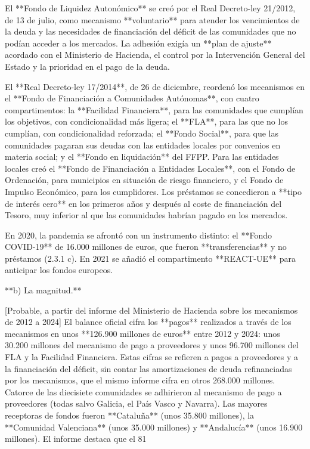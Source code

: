 \documentclass[10pt,a4paper]{article}
\begin{document}
El **Fondo de Liquidez Autonómico** se creó por el Real Decreto-ley 21/2012, de 13 de julio, como mecanismo **voluntario** para atender los vencimientos de la deuda y las necesidades de financiación del déficit de las comunidades que no podían acceder a los mercados. La adhesión exigía un **plan de ajuste** acordado con el Ministerio de Hacienda, el control por la Intervención General del Estado y la prioridad en el pago de la deuda.

El **Real Decreto-ley 17/2014**, de 26 de diciembre, reordenó los mecanismos en el **Fondo de Financiación a Comunidades Autónomas**, con cuatro compartimentos: la **Facilidad Financiera**, para las comunidades que cumplían los objetivos, con condicionalidad más ligera; el **FLA**, para las que no los cumplían, con condicionalidad reforzada; el **Fondo Social**, para que las comunidades pagaran sus deudas con las entidades locales por convenios en materia social; y el **Fondo en liquidación** del FFPP. Para las entidades locales creó el **Fondo de Financiación a Entidades Locales**, con el Fondo de Ordenación, para municipios en situación de riesgo financiero, y el Fondo de Impulso Económico, para los cumplidores. Los préstamos se concedieron a **tipo de interés cero** en los primeros años y después al coste de financiación del Tesoro, muy inferior al que las comunidades habrían pagado en los mercados.

En 2020, la pandemia se afrontó con un instrumento distinto: el **Fondo COVID-19** de 16.000 millones de euros, que fueron **transferencias** y no préstamos (2.3.1 c). En 2021 se añadió el compartimento **REACT-UE** para anticipar los fondos europeos.

**b) La magnitud.**

[Probable, a partir del informe del Ministerio de Hacienda sobre los mecanismos de 2012 a 2024] El balance oficial cifra los **pagos** realizados a través de los mecanismos en unos **126.900 millones de euros** entre 2012 y 2024: unos 30.200 millones del mecanismo de pago a proveedores y unos 96.700 millones del FLA y la Facilidad Financiera. Estas cifras se refieren a pagos a proveedores y a la financiación del déficit, sin contar las amortizaciones de deuda refinanciadas por los mecanismos, que el mismo informe cifra en otros 268.000 millones. Catorce de las diecisiete comunidades se adhirieron al mecanismo de pago a proveedores (todas salvo Galicia, el País Vasco y Navarra). Las mayores receptoras de fondos fueron **Cataluña** (unos 35.800 millones), la **Comunidad Valenciana** (unos 35.000 millones) y **Andalucía** (unos 16.900 millones). El informe destaca que el 81%
\end{document}
